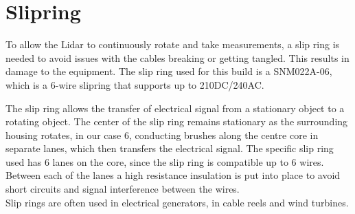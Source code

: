 \clearpage
\section{Slipring}

To allow the Lidar to continuously rotate and take measurements, a slip ring is needed to avoid issues with the cables breaking or getting tangled. This results in damage to the equipment. 
The slip ring used for this build is a SNM022A-06\cite{slipring}, which is a 6-wire slipring that supports up to 210DC/240AC. 

The slip ring allows the transfer of electrical signal from a stationary object to a rotating object. The center of the slip ring remains stationary as the surrounding housing rotates, in our case 6, conducting brushes along the centre core in separate lanes, which then transfers the electrical signal.
The specific slip ring used has 6 lanes on the core, since the slip ring is compatible up to 6 wires. Between each of the lanes a high resistance insulation is put into place to avoid short circuits and signal interference between the wires.\cite{slipringhow} \\
Slip rings are often used in electrical generators, in cable reels and wind turbines.

